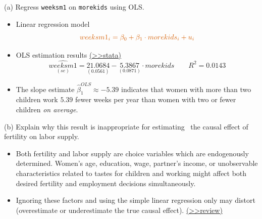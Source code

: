 \documentclass[
  10pt,
  ignorenonframetext,
]{beamer}
\providecommand{\tightlist}{%
  \setlength{\itemsep}{0pt}\setlength{\parskip}{0pt}}
\begin{document}
\begin{frame}{(a) Regress \texttt{weeksm1} on \texttt{morekids} using
OLS.}
\protect\hypertarget{q1-regOLS}{}
\begin{itemize}
\item
  Linear regression model \[
  \color{red}{weeksm1_i = \beta_0 + \beta_1 \cdot morekids_i + u_i}
  \]
\item
  OLS estimation results
  \footnotesize \protect\hyperlink{res1-regOLS}{(\textgreater\textgreater stata)}
  \normalsize \[
  \underset{(se)}{\widehat{weeksm1}} = \underset{(0.0561)}{21.0684} -  \underset{(0.0871)}{5.3867} \cdot morekids \qquad R^2=0.0143
  \]
\item
  The slope estimate \(\hat{\beta}_1^{OLS} \approx -5.39\) indicates
  that women with more than two children work \(5.39\) fewer weeks per
  year than women with two or fewer children \emph{on average}.
\end{itemize}
\end{frame}

\begin{frame}{(b) Explain why this result is inappropriate for
estimating ~the causal effect of fertility on labor supply.}
\protect\hypertarget{LRissue}{}
\begin{itemize}
\tightlist
\item
  Both fertility and labor supply are choice variables which are
  endogenously determined. Women's age, education, wage, partner's
  income, or unobservable characteristics related to tastes for children
  and working might affect both desired fertility and employment
  decisions simultaneously.
\end{itemize}

\vspace{3mm}

\begin{itemize}
\tightlist
\item
  Ignoring these factors and using the simple linear regression only may
  distort (overestimate or underestimate the true causal effect).
  \footnotesize \protect\hyperlink{OVB}{(\textgreater\textgreater review)}
  \normalsize
\end{itemize}
\end{frame}
\end{document}
